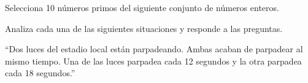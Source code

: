 \documentclass[11pt,addpoints]{exam}
\begin{document}

\begin{questions}

    \question[10] Selecciona 10 n\'umeros primos del siguiente conjunto de n\'umeros enteros.
    \begin{multicols}{6}
        \begin{checkboxes}
        \end{checkboxes}
    \end{multicols}

    \question Analiza cada una de las siguientes situaciones y responde a las preguntas.

    ``Dos luces del estadio local están parpadeando. Ambas acaban de parpadear al mismo tiempo.
    Una de las luces parpadea cada 12 segundos y la otra parpadea cada 18 segundos.''
    \begin{parts}

\end{parts}
\end{questions}
\end{document}
